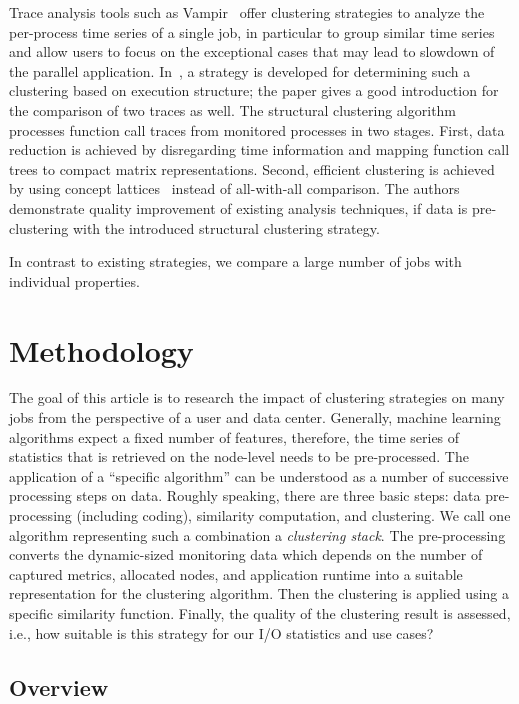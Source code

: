 \documentclass{jhps}
\begin{document}
Trace analysis tools such as Vampir~\cite{nagel1996vampir} offer clustering strategies to analyze the per-process time series of a single job, in particular to group similar time series and allow users to focus on the exceptional cases that may lead to slowdown of the parallel application.
In~\cite{weber2016structural}, a strategy is developed for determining such a clustering based on execution structure; the paper gives a good introduction for the comparison of two traces as well.
The structural clustering algorithm processes function call traces from monitored processes in two stages.
First, data reduction is achieved by disregarding time information and mapping function call trees to compact matrix representations.
Second, efficient clustering is achieved by using concept lattices~\cite{ganter1999formal} instead of all-with-all comparison.
The authors demonstrate quality improvement of existing analysis techniques, if data is pre-clustering with the introduced structural clustering strategy.

In contrast to existing strategies, we compare a large number of jobs with individual properties.

\section{Methodology}%
\label{sec:methodology}

The goal of this article is to research the impact of clustering strategies on many jobs from the perspective of a user and data center.
Generally, machine learning algorithms expect a fixed number of features, therefore, the time series of statistics that is retrieved on the node-level needs to be pre-processed.
The application of a “specific algorithm” can be understood as a number of successive processing steps on data.
Roughly speaking, there are three basic steps: data pre-processing (including coding), similarity computation, and clustering.
We call one algorithm representing such a combination a \textit{clustering stack}.
The pre-processing converts the dynamic-sized monitoring data which depends on the number of captured metrics, allocated nodes, and application runtime into a suitable representation for the clustering algorithm.
Then the clustering is applied using a specific similarity function.
Finally, the quality of the clustering result is assessed, i.e., how suitable is this strategy for our I/O statistics and use cases?

\subsection{Overview}
\end{document}

